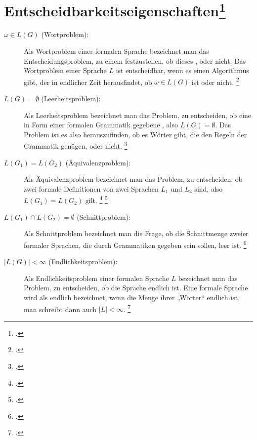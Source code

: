 \documentclass{bschlangaul-theorie}
\begin{document}
\section{Entscheidbarkeitseigenschaften\footcite[Seite 591 Kapitel 19.1.3.3]{schneider}}

\begin{description}

%

\item[$\omega \in L(G)$ (Wortproblem):]

Als Wortproblem einer formalen Sprache bezeichnet man das
Entscheidungsproblem, zu einem  festzustellen, ob
dieses , oder nicht. Das Wortproblem einer
Sprache $L$ ist entscheidbar, wenn es einen Algorithmus gibt, der in
endlicher Zeit herausfindet, ob $\omega \in L(G)$ ist oder nicht.
\footcite{wiki:wortproblem}

%

\item[$L(G) = \emptyset$ (Leerheitsproblem):]

Als Leerheitsproblem bezeichnet man das Problem, zu entscheiden, ob eine
in Form einer formalen Grammatik gegebene , also $L(G) = \emptyset$. Das Problem ist es also
herauszufinden, ob es Wörter gibt, die den Regeln der Grammatik genügen,
oder nicht.
\footcite{wiki:leerheitsproblem}

%

\item[$L(G_1) = L(G_2)$ (Äquivalenzproblem):]

Als Äquivalenzproblem bezeichnet man das Problem, zu entscheiden, ob
zwei formale Definitionen von zwei Sprachen $L_1$ und $L_2$
 sind, also $L(G_1) = L(G_2)$ gilt.
\footcite[Seite 70-71]{theo:fs:1}
\footcite{wiki:aequivalenzproblem}

%

\item[$L(G_1) \cap L(G_2) = \emptyset$ (Schnittproblem):]

Als Schnittproblem bezeichnet man die Frage, ob die Schnittmenge zweier
formaler Sprachen, die durch Grammatiken gegeben sein sollen, leer ist.
\footcite{wiki:schnittproblem}

%

\item[$|L(G)| < \infty$ (Endlichkeitsproblem):]

Als Endlichkeitsproblem einer formalen Sprache $L$ bezeichnet man das
Problem, zu entscheiden, ob die Sprache endlich ist. Eine formale
Sprache wird als endlich bezeichnet, wenn die Menge ihrer
„Wörter“ endlich ist, man schreibt dann auch $|L| < \infty$.
\footcite{wiki:endlichkeitsproblem}
\end{description}
\end{document}

